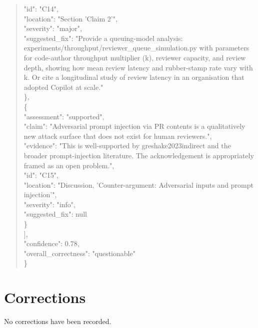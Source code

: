 \documentclass[11pt]{article}
\begin{document}
\begin{quote}
      "id": "C14",\\
      "location": "Section 'Claim 2'",\\
      "severity": "major",\\
      "suggested\_fix": "Provide a queuing-model analysis: experiments/throughput/reviewer\_queue\_simulation.py with parameters for code-author throughput multiplier (k), reviewer capacity, and review depth, showing how mean review latency and rubber-stamp rate vary with k. Or cite a longitudinal study of review latency in an organisation that adopted Copilot at scale."\\
    \},\\
    \{\\
      "assessment": "supported",\\
      "claim": "Adversarial prompt injection via PR contents is a qualitatively new attack surface that does not exist for human reviewers.",\\
      "evidence": "This is well-supported by greshake2023indirect and the broader prompt-injection literature. The acknowledgement is appropriately framed as an open problem.",\\
      "id": "C15",\\
      "location": "Discussion, 'Counter-argument: Adversarial inputs and prompt injection'",\\
      "severity": "info",\\
      "suggested\_fix": null\\
    \}\\
  ],\\
  "confidence": 0.78,\\
  "overall\_correctness": "questionable"\\
\}\\
\end{quote}

\section*{Corrections}
No corrections have been recorded.
\end{document}
